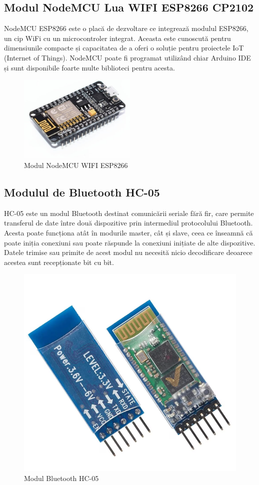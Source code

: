 \subsection{Modul NodeMCU Lua WIFI ESP8266 CP2102}
NodeMCU ESP8266 este o placă de dezvoltare ce integrează modulul ESP8266, un cip WiFi cu un microcontroler integrat. Aceasta este cunoscută pentru dimensiunile compacte și capacitatea de a oferi o soluție pentru proiectele IoT (Internet of Things). NodeMCU poate fi programat utilizând chiar Arduino IDE și sunt disponibile foarte multe biblioteci pentru acesta\cite{nodemcu_datasheet}.

\begin{figure}[H]
\includegraphics[width=0.5\textwidth, height=0.4\textwidth]{images/nodemcu.png}
\caption{Modul NodeMCU WIFI ESP8266 \cite{nodemcu_poza}}
\label{fig:nodemcu}
\end{figure}

\subsection{Modulul de Bluetooth HC-05}
HC-05 este un modul Bluetooth destinat comunicării seriale fără fir, care permite transferul de date între două dispozitive prin intermediul protocolului Bluetooth. Acesta poate funcționa atât în modurile master, cât și slave, ceea ce înseamnă că poate iniția conexiuni sau poate răspunde la conexiuni inițiate de alte dispozitive. Datele trimise sau primite de acest modul nu necesită nicio decodificare deoarece acestea sunt recepționate bit cu bit.

\begin{figure}[H]
\includegraphics[width=0.3\linewidth]{images/hc05.png}
\caption{Modul Bluetooth HC-05 \cite{hc05_poza}}
\label{fig:hc05}
\end{figure}

